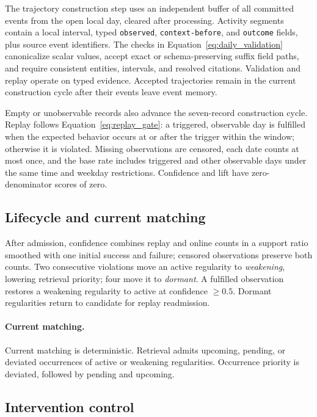The trajectory construction step uses an independent buffer of all committed events from the open local day, cleared after processing.
Activity segments contain a local interval, typed \texttt{observed}, \texttt{context-before}, and \texttt{outcome} fields, plus source event identifiers.
The checks in Equation~\ref{eq:daily_validation} canonicalize scalar values, accept exact or schema-preserving suffix field paths, and require consistent entities, intervals, and resolved citations.
Validation and replay operate on typed evidence.
Accepted trajectories remain in the current construction cycle after their events leave event memory.

Empty or unobservable records also advance the seven-record construction cycle.
Replay follows Equation~\ref{eq:replay_gate}: a triggered, observable day is fulfilled when the expected behavior occurs at or after the trigger within the window; otherwise it is violated.
Missing observations are censored, each date counts at most once, and the base rate includes triggered and other observable days under the same time and weekday restrictions.
Confidence and lift have zero-denominator scores of zero.

\subsection{Lifecycle and current matching}
\label{app:lifecycle}

After admission, confidence combines replay and online counts in a support ratio smoothed with one initial success and failure; censored observations preserve both counts.
Two consecutive violations move an active regularity to \emph{weakening}, lowering retrieval priority; four move it to \emph{dormant}.
A fulfilled observation restores a weakening regularity to active at confidence $\geq0.5$.
Dormant regularities return to candidate for replay readmission.

\paragraph{Current matching.}
\label{app:matching}
Current matching is deterministic.
Retrieval admits upcoming, pending, or deviated occurrences of active or weakening regularities.
Occurrence priority is deviated, followed by pending and upcoming.

\subsection{Intervention control}
\label{app:intervention_control}

